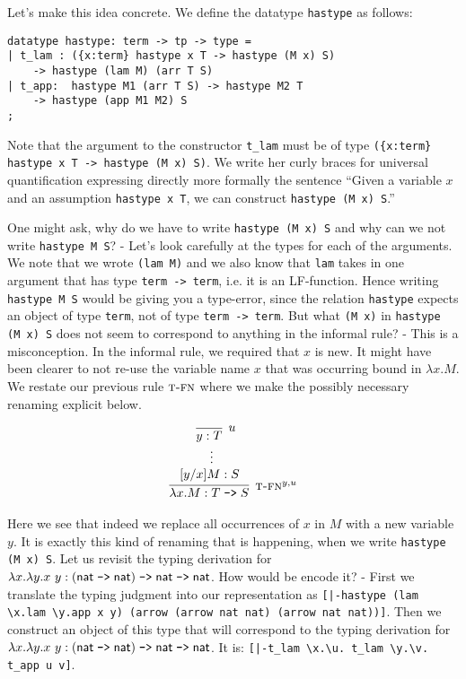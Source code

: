 Let's make this idea concrete. We define the datatype \lstinline!hastype! as
follows:

\begin{lstlisting}
datatype hastype: term -> tp -> type =
| t_lam : ({x:term} hastype x T -> hastype (M x) S)
	-> hastype (lam M) (arr T S)
| t_app:  hastype M1 (arr T S) -> hastype M2 T
	-> hastype (app M1 M2) S
;  
\end{lstlisting}

Note that the argument to the constructor \lstinline!t_lam! must be of type 
\lstinline!({x:term} hastype x T -> hastype (M x) S)!. We write her curly braces
for universal quantification expressing directly more formally the sentence 
``Given a variable $x$ and an assumption \lstinline!hastype x T!, we can
construct \lstinline!hastype (M x) S!.'' 

One might ask, why do we have to write \lstinline!hastype (M x) S! and why can
we not write \lstinline!hastype M S!? - Let's look carefully at the types for
each of the arguments. We note that we wrote \lstinline!(lam M)! and we also
know that \lstinline!lam! takes in one argument that has type 
\lstinline!term -> term!, i.e. it is an LF-function. Hence writing \lstinline!hastype M S! would be
giving you a type-error, since the relation \lstinline!hastype! expects an
object of type \lstinline!term!, not of type \lstinline!term -> term!.
But what \lstinline!(M x)! in \lstinline!hastype (M x) S! does not seem to
correspond to anything in the informal rule? - This is a misconception. In the
informal rule, we required that $x$ is new. It might have been clearer to not
re-use the variable name $x$ that was occurring bound in $\lambda
x.M$. We restate our previous rule $\textsc{t-fn}$ where we make the possibly necessary
renaming explicit below.

\[
\begin{array}{c}
\infer[\TFn^{y,u}]{\lambda x.M : T \arrow S}{
  \begin{array}{c}
  \infer[u]{y:T}{} \\
  \vdots~~\\
   ~[y/x]M : S~~~~   
  \end{array}
}  
\end{array}
\]

Here we see that indeed we replace all occurrences of $x$ in $M$ with a new
variable $y$. It is exactly this kind of renaming that is happening, when we
write \lstinline!hastype (M x) S!.
\noindent
Let us revisit the typing derivation for $\lambda x.\lambda y.x~y : (\textsf{nat} \mathrel{\texttt{->}}
\textsf{nat}) \mathrel{\texttt{->}} \textsf{nat} \mathrel{\texttt{->}} \textsf{nat}$. How would be encode it? - First we translate the
typing judgment into our representation as
\lstinline![|-hastype (lam \x.lam \y.app x y) (arrow (arrow nat nat) (arrow nat nat))]!.
Then we construct an object of this type that will correspond to the typing
derivation for  $\lambda x.\lambda y.x~y : (\textsf{nat} \mathrel{\texttt{->}}
\textsf{nat}) \mathrel{\texttt{->}} \textsf{nat} \mathrel{\texttt{->}} \textsf{nat}$.
%
It is: \lstinline![|-t_lam \x.\u. t_lam \y.\v. t_app u v]!.


